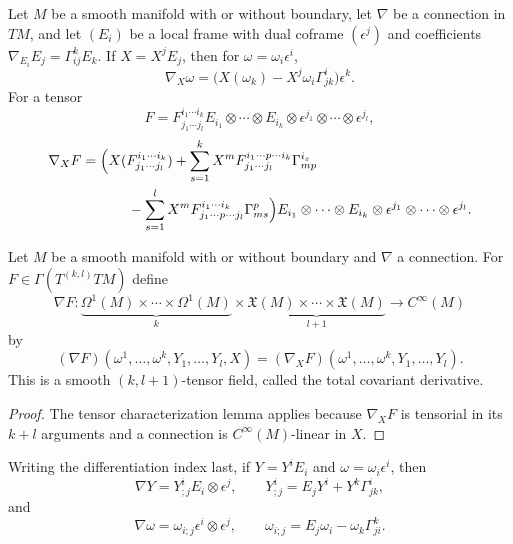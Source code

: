 \begin{proposition}
\label{prop:covariant-derivative-components}
Let $M$ be a smooth manifold with or without boundary, let $\nabla$ be a
connection in $TM$, and let $(E_i)$ be a local frame with dual coframe
$(\epsilon^j)$ and coefficients $\nabla_{E_i}E_j=\Gamma^k_{ij}E_k$.
If $X=X^jE_j$, then for
$\omega=\omega_i\epsilon^i$,
\[
\nabla_X\omega=\bigl(X(\omega_k)-X^j\omega_i\Gamma^i_{jk}\bigr)\epsilon^k.
\]
For a tensor
\[
F=F^{i_1\cdots i_k}_{j_1\cdots j_l}
E_{i_1}\otimes\cdots\otimes E_{i_k}\otimes
\epsilon^{j_1}\otimes\cdots\otimes\epsilon^{j_l},
\]
\[
\begin{aligned}
\nabla_XF={}&\Bigl(X(F^{i_1\cdots i_k}_{j_1\cdots j_l})
+\sum_{s=1}^kX^mF^{i_1\cdots p\cdots i_k}_{j_1\cdots j_l}\Gamma^{i_s}_{mp}\\
&\qquad-\sum_{s=1}^lX^mF^{i_1\cdots i_k}_{j_1\cdots p\cdots j_l}\Gamma^p_{ms}\Bigr)
E_{i_1}\otimes\cdots\otimes E_{i_k}\otimes
\epsilon^{j_1}\otimes\cdots\otimes\epsilon^{j_l}.
\end{aligned}
\]
\end{proposition}

\begin{proposition}
\label{prop:total-covariant-derivative}
Let $M$ be a smooth manifold with or without boundary and $\nabla$ a
connection. For $F\in\Gamma(T^{(k,l)}TM)$ define
\[
\nabla F\colon\underbrace{\Omega^1(M)\times\cdots\times\Omega^1(M)}_{k}
\times\underbrace{\mathfrak{X}(M)\times\cdots\times\mathfrak{X}(M)}_{l+1}
\longrightarrow C^\infty(M)
\]
by
\begin{equation}
(\nabla F)(\omega^1,\ldots,\omega^k,Y_1,\ldots,Y_l,X)
=(\nabla_XF)(\omega^1,\ldots,\omega^k,Y_1,\ldots,Y_l).
\tag{4.14}
\end{equation}
This is a smooth $(k,l+1)$-tensor field, called the total covariant derivative.
\end{proposition}
\begin{proof}
\sketch The tensor characterization lemma applies because $\nabla_XF$ is
tensorial in its $k+l$ arguments and a connection is $C^\infty(M)$-linear in
$X$.
\end{proof}

Writing the differentiation index last, if $Y=Y^iE_i$ and
$\omega=\omega_i\epsilon^i$, then
\[
\nabla Y=Y^i_{;j}E_i\otimes\epsilon^j,
\qquad Y^i_{;j}=E_jY^i+Y^k\Gamma^i_{jk},
\]
and
\[
\nabla\omega=\omega_{i;j}\epsilon^i\otimes\epsilon^j,
\qquad \omega_{i;j}=E_j\omega_i-\omega_k\Gamma^k_{ji}.
\]

